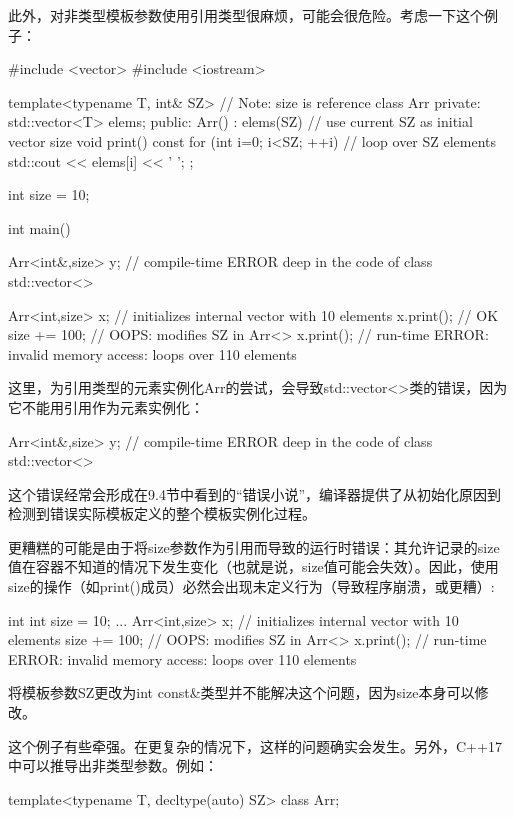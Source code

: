 此外，对非类型模板参数使用引用类型很麻烦，可能会很危险。考虑一下这个例子：

\begin{cpp}
#include <vector>
#include <iostream>

template<typename T, int& SZ> // Note: size is reference
class Arr {
private:
	std::vector<T> elems;
public:
	Arr() : elems(SZ) { // use current SZ as initial vector size
	}
	void print() const {
		for (int i=0; i<SZ; ++i) { // loop over SZ elements
			std::cout << elems[i] << ' ';
		}
	}
};

int size = 10;

int main()
{
	Arr<int&,size> y; // compile-time ERROR deep in the code of class std::vector<>

	Arr<int,size> x; // initializes internal vector with 10 elements
	x.print(); // OK
	size += 100; // OOPS: modifies SZ in Arr<>
	x.print(); // run-time ERROR: invalid memory access: loops over 110 elements
}
\end{cpp}

这里，为引用类型的元素实例化Arr的尝试，会导致std::vector<>类的错误，因为它不能用引用作为元素实例化：

\begin{cpp}
Arr<int&,size> y; // compile-time ERROR deep in the code of class std::vector<>
\end{cpp}

这个错误经常会形成在9.4节中看到的“错误小说”，编译器提供了从初始化原因到检测到错误实际模板定义的整个模板实例化过程。

更糟糕的可能是由于将size参数作为引用而导致的运行时错误：其允许记录的size值在容器不知道的情况下发生变化（也就是说，size值可能会失效）。因此，使用size的操作（如print()成员）必然会出现未定义行为（导致程序崩溃，或更糟）:

\begin{cpp}
int int size = 10;
...
Arr<int,size> x; // initializes internal vector with 10 elements
size += 100; // OOPS: modifies SZ in Arr<>
x.print(); // run-time ERROR: invalid memory access: loops over 110 elements
\end{cpp}

将模板参数SZ更改为int const\&类型并不能解决这个问题，因为size本身可以修改。

这个例子有些牵强。在更复杂的情况下，这样的问题确实会发生。另外，C++17中可以推导出非类型参数。例如：

\begin{cpp}
template<typename T, decltype(auto) SZ>
class Arr;
\end{cpp}


